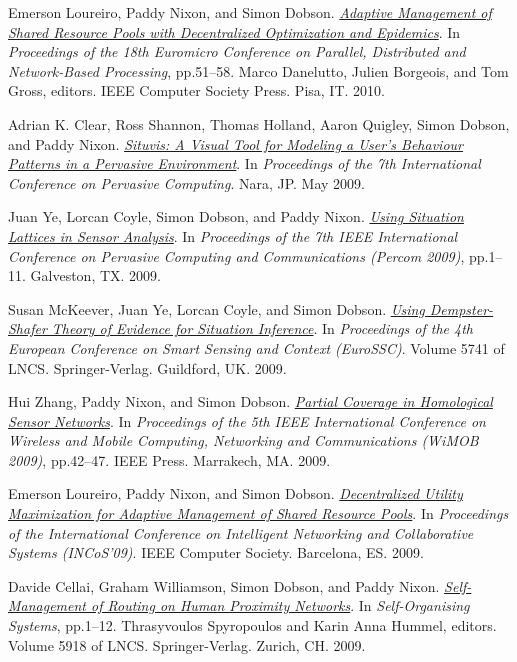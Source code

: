 \documentclass[11pt]{article}
\begin{document}
\label{org2791c2f}Emerson Loureiro, Paddy Nixon, and Simon Dobson.  \emph{\href{https://simondobson.org/softcopy/pdp-10.pdf}{Adaptive Management of Shared Resource Pools with Decentralized Optimization and Epidemics}}. In \emph{Proceedings of the 18th Euromicro Conference on Parallel, Distributed and Network-Based Processing}, pp.51–58. Marco Danelutto, Julien Borgeois, and Tom Gross, editors. IEEE Computer Society Press. Pisa, IT. 2010.

\label{org9d58e67}Adrian K. Clear, Ross Shannon, Thomas Holland, Aaron Quigley, Simon Dobson, and Paddy Nixon.  \emph{\href{https://simondobson.org/softcopy/situvis-pervasive-09.pdf}{Situvis: A Visual Tool for Modeling a User’s Behaviour Patterns in a Pervasive Environment}}. In \emph{Proceedings of the 7th International Conference on Pervasive Computing}. Nara, JP. May 2009.

\label{org1df4290}Juan Ye, Lorcan Coyle, Simon Dobson, and Paddy Nixon.  \emph{\href{https://simondobson.org/softcopy/percom2009.pdf}{Using Situation Lattices in Sensor Analysis}}. In \emph{Proceedings of the 7th IEEE International Conference on Pervasive Computing and Communications (Percom 2009)}, pp.1–11. Galveston, TX. 2009.

\label{orgc71eb53}Susan McKeever, Juan Ye, Lorcan Coyle, and Simon Dobson.  \emph{\href{https://simondobson.org/softcopy/ds-situation-inference-eurossc-09.pdf}{Using Dempster-Shafer Theory of Evidence for Situation Inference}}. In \emph{Proceedings of the 4th European Conference on Smart Sensing and Context (EuroSSC)}. Volume 5741 of LNCS. Springer-Verlag. Guildford, UK. 2009.

\label{orgedb8b03}Hui Zhang, Paddy Nixon, and Simon Dobson.  \emph{\href{https://simondobson.org/softcopy/wimob-09.pdf}{Partial Coverage in Homological Sensor Networks}}. In \emph{Proceedings of the 5th IEEE International Conference on Wireless and Mobile Computing, Networking and Communications (WiMOB 2009)}, pp.42–47. IEEE Press. Marrakech, MA. 2009.

\label{org477b933}Emerson Loureiro, Paddy Nixon, and Simon Dobson.  \emph{\href{https://simondobson.org/softcopy/incos-09.pdf}{Decentralized Utility Maximization for Adaptive Management of Shared Resource Pools}}. In \emph{Proceedings of the International Conference on Intelligent Networking and Collaborative Systems (INCoS’09)}. IEEE Computer Society. Barcelona, ES. 2009.

\label{orge640491}Davide Cellai, Graham Williamson, Simon Dobson, and Paddy Nixon.  \emph{\href{https://simondobson.org/softcopy/iwsos-09.pdf}{Self-Management of Routing on Human Proximity Networks}}. In \emph{Self-Organising Systems}, pp.1–12. Thrasyvoulos Spyropoulos and Karin Anna Hummel, editors. Volume 5918 of LNCS. Springer-Verlag. Zurich, CH. 2009.
\end{document}
